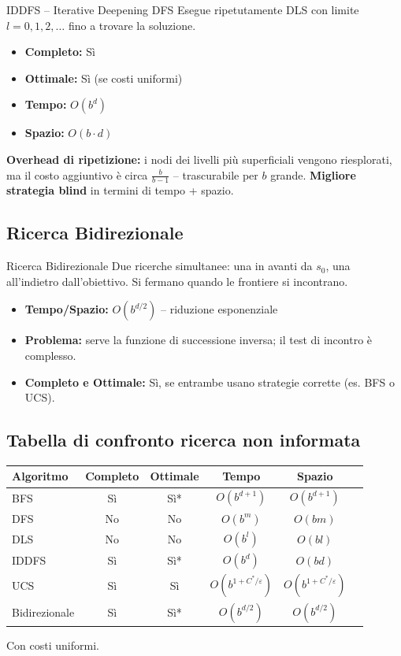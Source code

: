 \documentclass[12pt,a4paper]{article}
\begin{document}
\begin{thmbox}{IDDFS -- Iterative Deepening DFS}
Esegue ripetutamente DLS con limite $l = 0, 1, 2, \ldots$ fino a trovare la soluzione.

\begin{itemize}[noitemsep]
  \item \textbf{Completo:} Sì
  \item \textbf{Ottimale:} Sì (se costi uniformi)
  \item \textbf{Tempo:} $O(b^d)$
  \item \textbf{Spazio:} $O(b \cdot d)$
\end{itemize}
\textbf{Overhead di ripetizione:} i nodi dei livelli più superficiali vengono riesplorati, ma il costo aggiuntivo è circa $\frac{b}{b-1}$ -- trascurabile per $b$ grande. \textbf{Migliore strategia blind} in termini di tempo + spazio.
\end{thmbox}

\subsection{Ricerca Bidirezionale}

\begin{thmbox}{Ricerca Bidirezionale}
Due ricerche simultanee: una in avanti da $s_0$, una all'indietro dall'obiettivo. Si fermano quando le frontiere si incontrano.

\begin{itemize}[noitemsep]
  \item \textbf{Tempo/Spazio:} $O(b^{d/2})$ -- riduzione esponenziale
  \item \textbf{Problema:} serve la funzione di successione inversa; il test di incontro è complesso.
  \item \textbf{Completo e Ottimale:} Sì, se entrambe usano strategie corrette (es. BFS o UCS).
\end{itemize}
\end{thmbox}

\subsection{Tabella di confronto ricerca non informata}

\begin{center}
\renewcommand{\arraystretch}{1.2}
\begin{tabular}{lccccc}
\toprule
\textbf{Algoritmo} & \textbf{Completo} & \textbf{Ottimale} & \textbf{Tempo} & \textbf{Spazio} \\
\midrule
BFS & Sì & Sì* & $O(b^{d+1})$ & $O(b^{d+1})$ \\
DFS & No & No & $O(b^m)$ & $O(bm)$ \\
DLS & No & No & $O(b^l)$ & $O(bl)$ \\
IDDFS & Sì & Sì* & $O(b^d)$ & $O(bd)$ \\
UCS & Sì & Sì & $O(b^{1+C^*/\varepsilon})$ & $O(b^{1+C^*/\varepsilon})$ \\
Bidirezionale & Sì & Sì* & $O(b^{d/2})$ & $O(b^{d/2})$ \\
\bottomrule
\end{tabular}
\end{center}
{\small *Con costi uniformi.}
\end{document}
